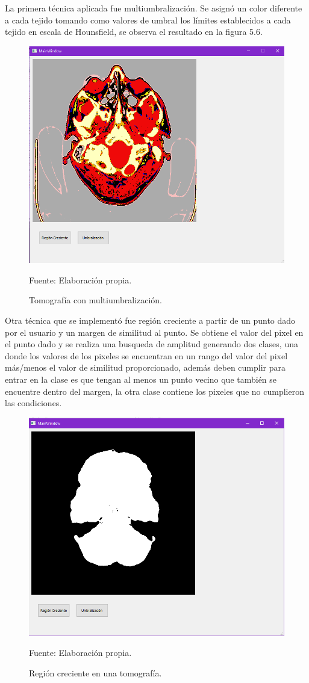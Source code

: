 \documentclass[12pt]{report}
\begin{document}
La primera técnica aplicada fue multiumbralización. Se asignó un color diferente a cada tejido tomando como valores de umbral los límites establecidos a cada tejido en escala de Hounsfield, se observa el resultado en la figura 5.6.

\begin{figure}[H]
\centering
\includegraphics[width = 12 cm, height = 10 cm]{umbralizado}
\caption{Tomografía con multiumbralización.}
Fuente: Elaboración propia.
\end{figure}

Otra técnica que se implementó fue región creciente a partir de un punto dado por el usuario  y un margen de similitud al punto. Se obtiene el valor del pixel en el punto dado y se realiza una busqueda de amplitud generando dos clases, una donde los valores de los pixeles se encuentran en un rango del valor del pixel más/menos el valor de similitud proporcionado, además deben cumplir para entrar en la clase es que tengan al menos un punto vecino que  también se encuentre dentro del margen, la otra clase contiene los pixeles que no cumplieron las condiciones.

\begin{figure}[H]
\centering
\includegraphics[width = 12 cm, height = 10 cm]{regionu}
\caption{Región creciente en una tomografía.}
Fuente: Elaboración propia.
\end{figure}




\end{document}
